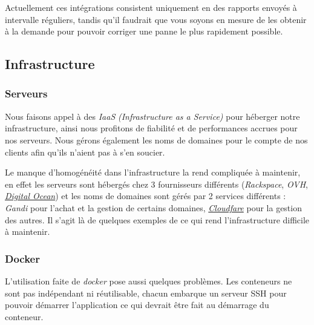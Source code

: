 \documentclass[12pt,a4paper]{article}
\begin{document}
  \bigskip

  Actuellement ces intégrations consistent uniquement en des rapports
  envoyés à intervalle réguliers, tandis qu'il faudrait que vous soyons en
  mesure de les obtenir à la demande pour pouvoir corriger une panne le
  plus rapidement possible.

  \newpage

  \subsection{Infrastructure}\label{infrastructure}

  \bigskip

  \subsubsection{Serveurs}\label{serveurs}

  \bigskip

  Nous faisons appel à des \emph{IaaS} \emph{(Infrastructure as a
  Service)} pour héberger notre infrastructure, ainsi nous profitons de
  fiabilité et de performances accrues pour nos serveurs. Nous gérons
  également les noms de domaines pour le compte de nos clients afin qu'ils
  n'aient pas à s'en soucier.

  \bigskip

  Le manque d'homogénéité dans l'infrastructure la rend compliquée à
  maintenir, en effet les serveurs sont hébergés chez 3 fournisseurs
  différents (\emph{Rackspace}, \emph{OVH},
  \href{http://digitalocean.com}{\emph{Digital Ocean}}) et les noms de
  domaines sont gérés par 2 services différents : \emph{Gandi} pour
  l'achat et la gestion de certains domaines,
  \href{http://cloudfare.com}{\emph{Cloudfare}} pour la gestion des
  autres. Il s'agit là de quelques exemples de ce qui rend
  l'infrastructure difficile à maintenir.

  \subsubsection{Docker}\label{docker}

  \bigskip

  L'utilisation faite de \emph{docker} pose aussi quelques problèmes. Les
  conteneurs ne sont pas indépendant ni réutilisable, chacun embarque un
  serveur SSH pour pouvoir démarrer l'application ce qui devrait être fait
  au démarrage du conteneur.

  \bigskip
\end{document}

